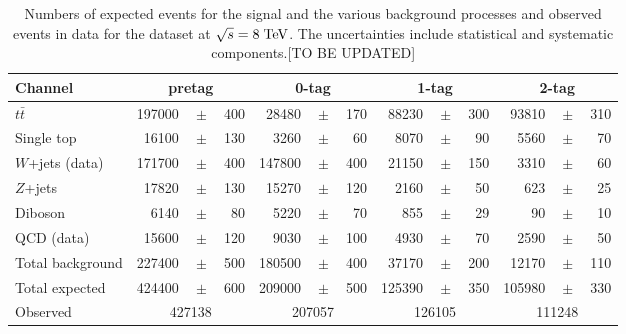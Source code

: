 \begin{table}
  \caption[Event yields for the \mujets{} samples at $\sqrt{s} = 8 \TeV{}$]{
    Numbers of expected events for the \ttbar{} signal and the various background 
    processes and observed events in data for the \mujets{} dataset
    at $\sqrt{s} = 8 \TeV{}$.
    The uncertainties include statistical and systematic components.[TO BE UPDATED]}
  \label{tab:yields2012mu}
  \begin{tabular}{ l  rrr  rrr  rrr  rrr }
    \toprule
    Channel & \multicolumn{3}{c}{\mujets{} pretag} & \multicolumn{3}{c}{\mujets{} 0-tag} & \multicolumn{3}{c}{\mujets{} 1-tag} & \multicolumn{3}{c}{\mujets{} 2-tag} \\
    \midrule      
    $t\bar{t}$       & 197000 &$\!\!\!\pm\!\!\!$& 400  & 28480 &$\!\!\!\pm\!\!\!$& 170  & 88230 &$\!\!\!\pm\!\!\!$& 300  & 93810 &$\!\!\!\pm\!\!\!$& 310  \\
    Single top       & 16100  &$\!\!\!\pm\!\!\!$& 130  & 3260  &$\!\!\!\pm\!\!\!$& 60  & 8070  &$\!\!\!\pm\!\!\!$& 90  & 5560  &$\!\!\!\pm\!\!\!$& 70   \\ 
    $W$+jets (data)  & 171700 &$\!\!\!\pm\!\!\!$& 400 & 147800  &$\!\!\!\pm\!\!\!$& 400  & 21150 &$\!\!\!\pm\!\!\!$& 150  & 3310 &$\!\!\!\pm\!\!\!$& 60  \\
    $Z$+jets         & 17820  &$\!\!\!\pm\!\!\!$& 130  & 15270   &$\!\!\!\pm\!\!\!$& 120  & 2160  &$\!\!\!\pm\!\!\!$& 50  & 623   &$\!\!\!\pm\!\!\!$& 25   \\
    Diboson          & 6140   &$\!\!\!\pm\!\!\!$& 80   & 5220  &$\!\!\!\pm\!\!\!$& 70 & 855 &$\!\!\!\pm\!\!\!$& 29 & 90  &$\!\!\!\pm\!\!\!$& 10 \\ 
    QCD (data)       & 15600  &$\!\!\!\pm\!\!\!$& 120  & 9030  &$\!\!\!\pm\!\!\!$& 100  & 4930  &$\!\!\!\pm\!\!\!$& 70  & 2590   &$\!\!\!\pm\!\!\!$& 50  \\ 
    \midrule
    Total background & 227400 &$\!\!\!\pm\!\!\!$& 500 & 180500  &$\!\!\!\pm\!\!\!$& 400  & 37170 &$\!\!\!\pm\!\!\!$& 200 & 12170  &$\!\!\!\pm\!\!\!$& 110  \\ 
    \midrule
    Total expected   & 424400 &$\!\!\!\pm\!\!\!$& 600 & 209000 &$\!\!\!\pm\!\!\!$& 500  & 125390 &$\!\!\!\pm\!\!\!$& 350 & 105980 &$\!\!\!\pm\!\!\!$& 330  \\ 
    \midrule
    Observed         & \multicolumn{3}{c}{427138}     & \multicolumn{3}{c}{207057}     & \multicolumn{3}{c}{126105}     & \multicolumn{3}{c}{111248}     \\ 
    \bottomrule
  \end{tabular}
\end{table}

